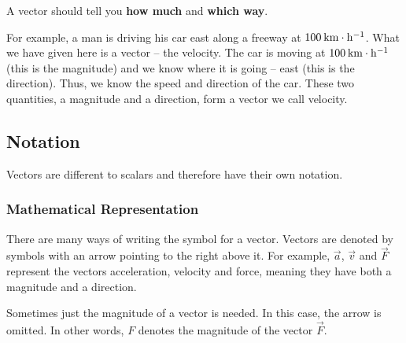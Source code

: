      \label{m38812*id186797}A vector should tell you \textbf{how much} and \textbf{which way}.\par 
      \label{m38812*id186810}For example, a man is driving his car east along a freeway at $100\phantom{\rule{2pt}{0ex}}\mathrm{km}\ensuremath{\cdot}\mathrm{h}{}^{-1}$. What we have given here is a vector -- the velocity. The car is moving at $100\phantom{\rule{2pt}{0ex}}\mathrm{km}\ensuremath{\cdot}\mathrm{h}{}^{-1}$ (this is the magnitude) and we know where it is going -- east (this is the direction). Thus, we know the speed and direction of the car. These two quantities, a magnitude and a direction, form a vector we call velocity.\par 
    \label{m38812*cid4}
            \subsection{ Notation}
            \nopagebreak
      \label{m38812*id186874}Vectors are different to scalars and therefore have their own notation.\par 
      \label{m38812*uid1}
            \subsubsection{ Mathematical Representation}
            \nopagebreak
        \label{m38812*id186887}There are many ways of writing the symbol for a vector. Vectors are denoted by symbols with an arrow pointing to the right above it. For example, $\stackrel{\to }{a}$, $\stackrel{\to }{v}$ and $\stackrel{\to }{F}$ represent the vectors acceleration, velocity and force, meaning they have both a magnitude and a direction.\par 
        \label{m38812*id186935}Sometimes just the magnitude of a vector is needed. In this case, the arrow is omitted. In other words, $F$ denotes the magnitude of the vector $\stackrel{\to }{F}$. \par 
      \label{m38812*uid2}
